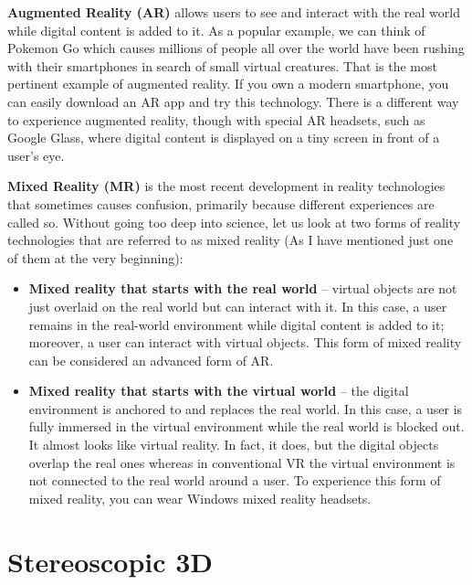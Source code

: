 \par \textbf{Augmented Reality (AR)} allows users to see and interact with the real world while digital content is added to it. As a popular example, we can think of Pokemon Go which causes millions of people all over the world have been rushing with their smartphones in search of small virtual creatures. That is the most pertinent example of augmented reality. \newline
If you own a modern smartphone, you can easily download an AR app and try this technology. There is a different way to experience augmented reality, though with special AR headsets, such as Google Glass, where digital content is displayed on a tiny screen in front of a user's eye.

\par \textbf{Mixed Reality (MR)} is the most recent development in reality technologies that sometimes causes confusion, primarily because different experiences are called so. Without going too deep into science, let us look at two forms of reality technologies that are referred to as mixed reality (As I have mentioned just one of them at the very beginning):

\begin{itemize}

\item \textbf{ Mixed reality that starts with the real world }– virtual objects are not just overlaid on the real world but can interact with it. In this case, a user remains in the real-world environment while digital content is added to it; moreover, a user can interact with virtual objects. This form of mixed reality can be considered an advanced form of AR.

\item  \textbf{Mixed reality that starts with the virtual world} – the digital environment is anchored to and replaces the real world. In this case, a user is fully immersed in the virtual environment while the real world is blocked out. It almost looks like virtual reality. In fact, it does, but the digital objects overlap the real ones whereas in conventional VR the virtual environment is not connected to the real world around a user. To experience this form of mixed reality, you can wear Windows mixed reality headsets. 
\end{itemize}

\section{Stereoscopic 3D}

